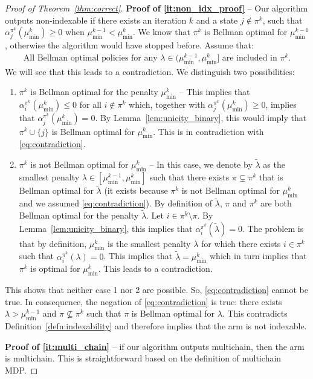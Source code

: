 \begin{proof}[Proof of Theorem~\ref{thm:correct}]
    \textbf{Proof of \ref{it:non_idx_proof}} -- 
    Our algorithm outputs non-indexable if there exists an iteration $k$ and a state $j\notin\pi^k$, such that $\alpha^{\pi^k}_j(\mu^k_{\min})\ge0$ when $\mu^{k-1}_{\min}<\mu^k_{\min}$.  We know that $\pi^k$ is Bellman optimal for $\mu^{k-1}_{\min}$, otherwise the algorithm would have stopped before. Assume that:
    \begin{align}
        \label{eq:contradiction}
        \text{All Bellman optimal policies for any $\lambda\in(\mu^{k-1}_{\min},\mu^k_{\min}]$ are included in $\pi^k$.}
    \end{align}
    We will see that this leads to a contradiction. We distinguish two possibilities: 
    \begin{enumerate}
        \item $\pi^k$ is Bellman optimal for the penalty $\mu^k_{\min}$ -- This implies that $\alpha^{\pi^k}_i(\mu^k_{\min})\le0$ for all $i\not\in\pi^k$ which, together with $\alpha^{\pi^k}_j(\mu^k_{\min})\ge0$, implies that $\alpha^{\pi^k}_j(\mu^k_{\min})=0$. By Lemma~\ref{lem:unicity_binary}, this would imply that $\pi^k\cup\{j\}$ is Bellman optimal for $\mu^k_{\min}$. This is in contradiction with \eqref{eq:contradiction}.
        \item $\pi^k$ is not Bellman optimal for $\mu^k_{\min}$ -- In this case, we denote by $\tilde{\lambda}$ as the smallest penalty $\lambda\in[\mu^{k-1}_{\min},\mu^{k}_{\min}]$ such that there exists $\pi\subsetneq\pi^k$ that is Bellman optimal for $\tilde{\lambda}$ (it exists because $\pi^k$ is not Bellman optimal for $\mu^k_{\min}$ and we assumed \eqref{eq:contradiction}).
            By definition of $\tilde{\lambda}$, $\pi$ and $\pi^k$ are both Bellman optimal for the penalty $\tilde{\lambda}$.
            Let $i\in\pi^k\setminus\pi$. By Lemma~\ref{lem:unicity_binary}, this implies that $\alpha^{\pi^k}_i(\tilde{\lambda})=0$. The problem is that by definition, $\mu^k_{\min}$ is the smallest penalty $\lambda$
            for which there exists $i\in\pi^k$ such that $\alpha^{\pi^k}_i(\lambda)=0$. This implies that $\tilde{\lambda}=\mu^k_{\min}$ which in turn implies that $\pi^k$ is optimal for $\mu^k_{\min}$. This leads to a contradiction.
    \end{enumerate}
    This shows that neither case 1 nor 2 are possible. So, \eqref{eq:contradiction} cannot be true.
    In consequence, the negation of \eqref{eq:contradiction} is true: there exists $\lambda>\mu^{k-1}_{\min}$ and $\pi\not\subseteq \pi^k$ such that $\pi$ is Bellman optimal for $\lambda$.
    This contradicts Definition~\ref{defn:indexability} and therefore implies that the arm is not indexable. 

    \medskip
    \textbf{Proof of \ref{it:multi_chain}} -- if our algorithm outputs multichain, then the arm is multichain.
    This is straightforward based on the definition of multichain MDP.
\end{proof}

